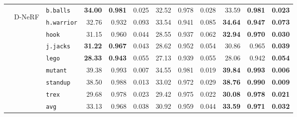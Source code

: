 \begin{table}[bp]
{\begin{tabular}{@{\hskip 2pt}cc|@{\hskip 2pt}l@{\hskip 2pt}|@{\hskip 2pt}r@{\hskip 2pt}r@{\hskip 2pt}r|@{\hskip 2pt}r@{\hskip 2pt}r@{\hskip 2pt}r|@{\hskip 2pt}r@{\hskip 2pt}r@{\hskip 2pt}r@{\hskip 2pt}}
& \multirow{9}{*}{\begin{sideways}D-NeRF\end{sideways}}
        & \texttt{b.balls}  & \bf 34.00 & \bf 0.981 & 0.025 & 32.52 & 0.978 & 0.028 &  33.59 & \bf 0.981 & \bf 0.023 \\
        & & \texttt{h.warrior}& 32.76 & 0.932 & 0.093 & 33.54 & 0.941 & 0.085 & \bf 34.64 & \bf 0.947 & \bf 0.073 \\
        & & \texttt{hook}     & 31.15 & 0.960 & 0.044 & 28.55 & 0.937 & 0.062 & \bf 32.94 & \bf 0.970 & \bf 0.030 \\
        & & \texttt{j.jacks}  & \bf 31.22 & \bf 0.967 & 0.043 & 28.62 & 0.952 & 0.054 & 30.86 & 0.965 & \bf 0.039 \\
        & & \texttt{lego}     & \bf 28.33 & \bf 0.943 & 0.055 & 27.13 & 0.939 &  0.055 & 28.06 & 0.942 & \bf 0.054 \\
        & & \texttt{mutant}   & 39.38 & 0.993 & 0.007 & 34.55 & 0.981 & 0.019 & \bf 39.84 & \bf 0.993 & \bf 0.006 \\
        & & \texttt{standup}  & 38.50 & 0.988 & 0.013 & 33.02 & 0.972 & 0.029 & \bf 38.76 & \bf 0.990 & \bf 0.009 \\
        & & \texttt{trex}     & 29.68 & 0.978 & 0.023 & 29.42 & 0.975 & 0.022 & \bf 30.08 & \bf 0.978 & \bf 0.021 \\
    \cmidrule{3-12}
        & & \texttt{avg}
          & 33.13
          & 0.968
          & 0.038
          & 30.92
          & 0.959
          & 0.044
          & \bf 33.59
          & \bf 0.971
          & \bf 0.032 \\
    \bottomrule
    \end{tabular}
    }
  \label{tab:detailed_combined}
\end{table}
